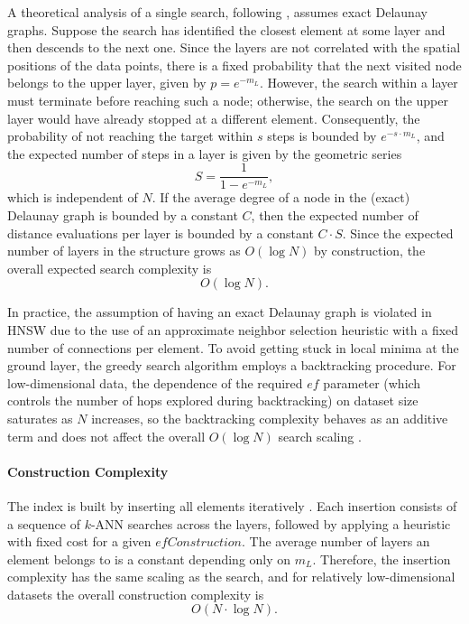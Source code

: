 A theoretical analysis of a single search, following \cite{Malkov-Yashunin-2016}, assumes exact Delaunay graphs. Suppose the search has identified the closest element at some layer and then descends to the next one. Since the layers are not correlated with the spatial positions of the data points, there is a fixed probability that the next visited node belongs to the upper layer, given by $p = e^{-m_L}$. However, the search within a layer must terminate before reaching such a node; otherwise, the search on the upper layer would have already stopped at a different element. Consequently, the probability of not reaching the target within $s$ steps is bounded by $e^{-s \cdot m_L}$, and the expected number of steps in a layer is given by the geometric series
\[
S = \frac{1}{1 - e^{-m_L}},
\]
which is independent of $N$. If the average degree of a node in the (exact) Delaunay graph is bounded by a constant $C$, then the expected number of distance evaluations per layer is bounded by a constant $C \cdot S$. Since the expected number of layers in the structure grows as $O(\log N)$ by construction, the overall expected search complexity is
\[
O(\log N).
\]

In practice, the assumption of having an exact Delaunay graph is violated in HNSW due to the use of an approximate neighbor selection heuristic with a fixed number of connections per element. To avoid getting stuck in local minima at the ground layer, the greedy search algorithm employs a backtracking procedure. For low-dimensional data, the dependence of the required $ef$ parameter (which controls the number of hops explored during backtracking) on dataset size saturates as $N$ increases, so the backtracking complexity behaves as an additive term and does not affect the overall $O(\log N)$ search scaling \cite{Malkov-Yashunin-2016}.

\paragraph{Construction Complexity}

The index is built by inserting all elements iteratively \cite{Malkov-Yashunin-2016}. Each insertion consists of a sequence of $k$-ANN searches across the layers, followed by applying a heuristic with fixed cost for a given $efConstruction$. The average number of layers an element belongs to is a constant depending only on $m_L$. Therefore, the insertion complexity has the same scaling as the search, and for relatively low-dimensional datasets the overall construction complexity is
\[
O(N \cdot \log N).
\]


